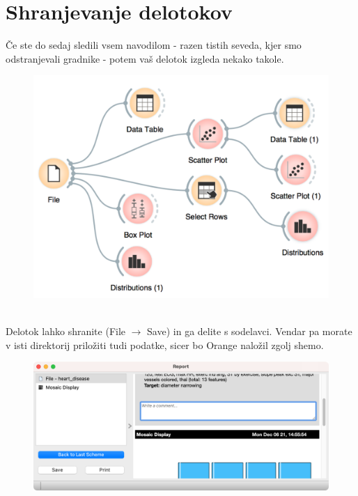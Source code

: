 \chapter{Shranjevanje delotokov}
\label{ch:shranjevanje-delotokov}

Če ste do sedaj sledili vsem navodilom - razen tistih seveda, kjer smo odstranjevali gradnike - potem vaš delotok izgleda nekako takole.

\begin{figure}[h]
    \centering
    \includegraphics[width=0.9\linewidth]{workflow.png}%
    \caption{$\;$}
    \label{fig:workflow}
  \end{figure}

Delotok lahko shranite (File $\rightarrow$ Save) in ga delite s sodelavci. Vendar pa morate v isti direktorij priložiti tudi podatke, sicer bo Orange naložil zgolj shemo.

\begin{figure}[h]
    \centering
    \includegraphics[width=0.9\linewidth]{report-full.png}%
    \caption{$\;$}
    \label{fig:report-full}
  \end{figure}

